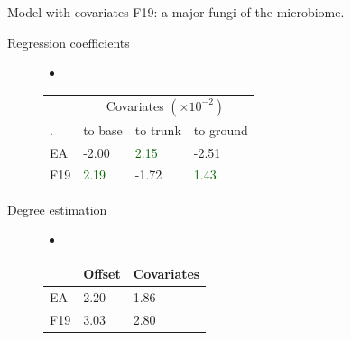 \documentclass[9pt]{beamer}
\newcommand{\pos}[1]{\textcolor{Darkgreen}{#1}}
\newcommand{\nega}[1]{\textcolor{Nicered}{#1}}
\begin{document}
\begin{frame}{Model with covariates}
F19: a major fungi of the microbiome.\vspace{0.3cm}
	\begin{description}
	\item[Regression coefficients]\begin{itemize}
	\item []
\end{itemize}%

\begin{table}[]
\begin{tabular}{l|lll}
  & \multicolumn{3}{|c}{Covariates $(\times 10^{-2})$}   \\\cline{2-4}
   .  & to base & to trunk & to ground \\\hline
EA  &  \nega{-2.00} &\pos{ 2.15  } &  \nega{-2.51  } \\
F19 & \pos{2.19 } &  \nega{-1.72}  & \pos{1.43  } 
\end{tabular}
\end{table}

	\item[Degree estimation]\begin{itemize}
	\item []
\end{itemize} \begin{table}[]
\begin{tabular}{l|ll}
    & Offset & Covariates \\\hline
EA  & 2.20   & 1.86      \\
F19 & 3.03   & 2.80     
\end{tabular}
\end{table}
\end{description}
\end{frame}
\end{document}
